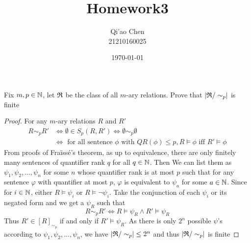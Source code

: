 \documentclass[11pt]{article}
\author{Qi'ao Chen\\21210160025}
\date{\today}
\title{Homework3}
\begin{document}
\maketitle
\begin{exercise}
Fix \(m,p\in\mathbb{N}\), let \(\mathfrak{R}\) be the class of all \(m\)-ary relations. Prove that \(\abs{\fR/\sim_p}\) is finite
\end{exercise}

\begin{proof}
For any \(m\)-ary relations \(R\) and \(R'\)
\begin{align*}
R\sim_p R'&\Leftrightarrow\emptyset\in S_p(R,R')\Leftrightarrow\emptyset\sim_p\emptyset\\
&\Leftrightarrow\text{ for all sentence $\phi$ with }QR(\phi)\le p, R\vDash\phi \text{ iff }R'\vDash\phi
\end{align*}
From proofs of Fraïssé's theorem, as up to equivalence, there are only finitely many sentences of quantifier rank \(q\) for
all \(q\in\mathbb{N}\). Then We can list them as \(\psi_1,\psi_2,\dots,\psi_n\) for some \(n\)  whose quantifier rank is at
most \(p\) such that for any sentence \(\varphi\) with quantifier at most \(p\), \(\varphi\) is equivalent to \(\psi_a\) for
some \(a\in\mathbb{N}\). Since for  \(i\in \mathbb{N}\),
either \(R\vDash\psi_i\) or \(R\vDash\neg\psi_i\).  Take the conjunction of each \(\psi_i\) or its negated form and we get a \(\psi_R\) such that
\begin{equation*}
R\sim_pR'\Leftrightarrow R\vDash\psi_R\wedge R'\vDash\psi_R
\end{equation*}
Thus \(R'\in[R]_{\sim_p}\) if and only if \(R'\vDash\psi_R\). As there is only \(2^n\) possible \(\psi\)'s according
to \(\psi_1,\psi_2,\dots,\psi_n\), we have \(\abs{\fR/\sim_p}\le 2^n\) and
thus \(\abs{\fR/\sim_p}\) is finite
\end{proof}
\end{document}
